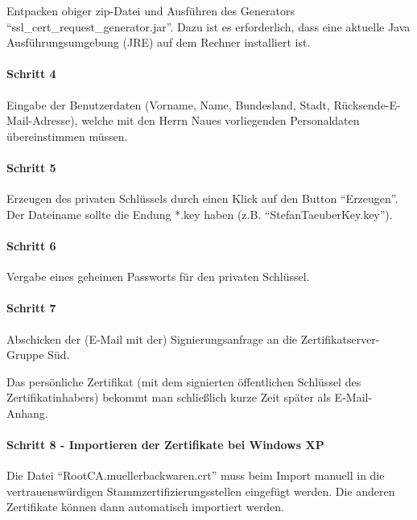 Entpacken obiger zip-Datei und Ausführen des Generators
``ssl\_cert\_request\_generator.jar''.  Dazu ist es erforderlich, dass eine
aktuelle Java Ausführungsumgebung (JRE) auf dem Rechner installiert ist.

\paragraph{Schritt 4}

Eingabe der Benutzerdaten (Vorname, Name, Bundesland, Stadt,
Rücksende-E-Mail-Adresse), welche mit den Herrn Naues vorliegenden Personaldaten
übereinstimmen müssen.

\paragraph{Schritt 5}

Erzeugen des privaten Schlüssels durch einen Klick auf den Button ``Erzeugen''.
Der Dateiname sollte die Endung *.key haben (z.B. ``StefanTaeuberKey.key'').

\paragraph{Schritt 6}

Vergabe eines geheimen Passworts für den privaten Schlüssel.

\paragraph{Schritt 7}

Abschicken der (E-Mail mit der) Signierungsanfrage an die
Zertifikatserver-Gruppe Süd.

Das persönliche Zertifikat (mit dem signierten öffentlichen Schlüssel des
Zertifikatinhabers) bekommt man schließlich kurze Zeit später als E-Mail-Anhang.

\paragraph{Schritt 8 - Importieren der Zertifikate bei Windows XP}

Die Datei ``RootCA.muellerbackwaren.crt'' muss beim Import manuell in die
vertrauenswürdigen Stammzertifizierungsstellen eingefügt werden. Die anderen
Zertifikate können dann automatisch importiert werden.

